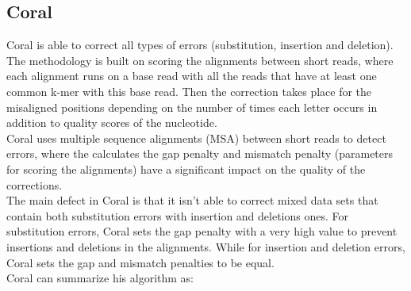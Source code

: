 \documentclass[12pt]{llncs}
\begin{document}
\subsection{Coral}
Coral \cite{Coral} is able to correct all types of errors (substitution, insertion and deletion). The methodology is built on scoring the alignments between short reads, where each alignment runs on a base read with all the reads that have at least one common k-mer with this base read. Then the correction takes place for the misaligned positions depending on the number of times each letter occurs in addition to quality scores of the nucleotide.
\\
Coral uses multiple sequence alignments (MSA) between short reads to detect errors, where the calculates the gap penalty and mismatch penalty (parameters for scoring the alignments) have a significant impact on the quality of the corrections. 
\\
The main defect in Coral is that it isn't able to correct mixed data sets that contain both substitution errors with insertion and deletions ones.
For substitution errors, Coral sets the gap penalty with a very high value to prevent insertions and deletions in the alignments. While for insertion and deletion errors, Coral sets the gap and mismatch penalties to be equal.
\\
Coral can summarize his algorithm as:
\end{document}
